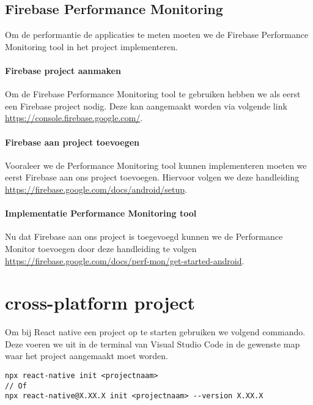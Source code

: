 \subsection{Firebase Performance Monitoring}
Om de performantie de applicaties te meten moeten we de Firebase Performance Monitoring tool 
in het project implementeren. 

\paragraph{Firebase project aanmaken}
Om de Firebase Performance Monitoring tool te gebruiken hebben we als eerst een Firebase project nodig.
Deze kan aangemaakt worden via volgende link \url{https://console.firebase.google.com/}.

\paragraph{Firebase aan project toevoegen}
Vooraleer we de Performance Monitoring tool kunnen implementeren moeten we eerst Firebase 
aan ons project toevoegen. Hiervoor volgen we deze handleiding 
\url{https://firebase.google.com/docs/android/setup}.



\paragraph{Implementatie Performance Monitoring tool}
Nu dat Firebase aan ons project is toegevoegd kunnen we de Performance Monitor 
toevoegen door deze handleiding te volgen \url{https://firebase.google.com/docs/perf-mon/get-started-android}.



\section{cross-platform project}\label{sec:projectencross}
Om bij React native een project op te starten gebruiken we volgend commando. 
Deze voeren we uit in de terminal van Visual Studio Code in de gewenste map waar 
het project aangemaakt moet worden.
\begin{verbatim}
npx react-native init <projectnaam>
// Of
npx react-native@X.XX.X init <projectnaam> --version X.XX.X
\end{verbatim}


